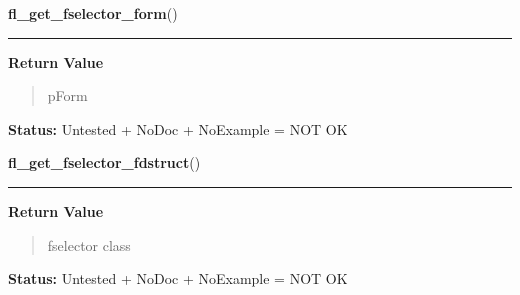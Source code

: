     \label{xformslib:library:fl_get_fselector_form}

    \vspace{0.5ex}

\hspace{.8\funcindent}\begin{boxedminipage}{\funcwidth}

    \raggedright \textbf{fl\_get\_fselector\_form}()

    \vspace{-1.5ex}

    \rule{\textwidth}{0.5\fboxrule}
\setlength{\parskip}{2ex}
\setlength{\parskip}{1ex}
      \textbf{Return Value}
    \vspace{-1ex}

      \begin{quote}
      pForm

      \end{quote}

\textbf{Status:} Untested + NoDoc + NoExample = NOT OK



    \end{boxedminipage}

    \label{xformslib:library:fl_get_fselector_fdstruct}

    \vspace{0.5ex}

\hspace{.8\funcindent}\begin{boxedminipage}{\funcwidth}

    \raggedright \textbf{fl\_get\_fselector\_fdstruct}()

    \vspace{-1.5ex}

    \rule{\textwidth}{0.5\fboxrule}
\setlength{\parskip}{2ex}
\setlength{\parskip}{1ex}
      \textbf{Return Value}
    \vspace{-1ex}

      \begin{quote}
      fselector class

      \end{quote}

\textbf{Status:} Untested + NoDoc + NoExample = NOT OK



    \end{boxedminipage}

